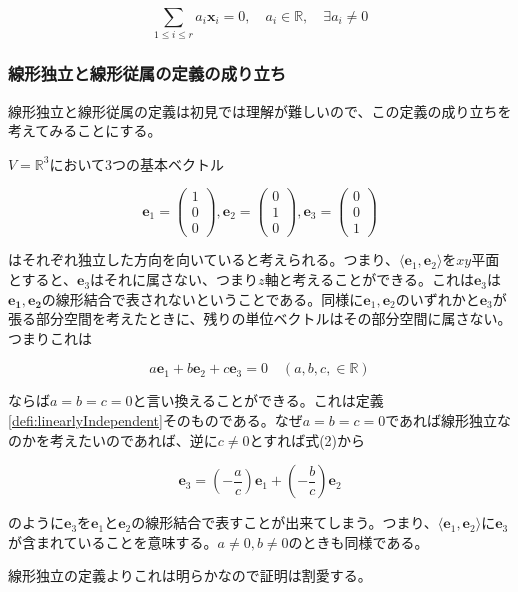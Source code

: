 \documentclass[dvipdfmx,autodetect-engine]{jsarticle}
\newcommand{\vecSpace}[1]{\mathbb{R}^{#1}}
\begin{document}
$$
\sum_{1 \leq i \leq r} a_i\bm{x}_i = 0, \quad a_i \in \mathbb{R}, \quad \exists a_i \neq 0
$$

\subsubsection{線形独立と線形従属の定義の成り立ち}

線形独立と線形従属の定義は初見では理解が難しいので、この定義の成り立ちを考えてみることにする。

$V = \vecSpace{3}$において3つの基本ベクトル

$$
\bm{e}_1 = \begin{pmatrix}
1 \\
0 \\
0
\end{pmatrix}, 
\bm{e}_2 = \begin{pmatrix}
0 \\
1 \\
0
\end{pmatrix}, 
\bm{e}_3 = \begin{pmatrix}
0 \\
0 \\
1
\end{pmatrix}
$$

はそれぞれ独立した方向を向いていると考えられる。つまり、$\langle \bm{e}_1, \bm{e}_2 \rangle$を$xy$平面とすると、$\bm{e}_3$はそれに属さない、つまり$z$軸と考えることができる。これは$\bm{e}_3$は$\bm{e_1}, \bm{e_2}$の線形結合で表されないということである。同様に$\bm{e}_1, \bm{e}_2$のいずれかと$\bm{e}_3$が張る部分空間を考えたときに、残りの単位ベクトルはその部分空間に属さない。つまりこれは

\begin{equation}
    a\bm{e}_1 + b\bm{e}_2 + c\bm{e}_3 = 0 \quad (a, b, c, \in \mathbb{R}) 
\end{equation}

ならば$a = b = c = 0$と言い換えることができる。これは定義\ref{defi:linearlyIndependent}そのものである。なぜ$a = b = c = 0$であれば線形独立なのかを考えたいのであれば、逆に$c \neq 0$とすれば式(2)から

$$
\bm{e}_3 = \left(-\frac{a}{c}\right)\bm{e}_1 + \left(-\frac{b}{c}\right)\bm{e}_2
$$

のように$\bm{e}_3$を$\bm{e}_1$と$\bm{e}_2$の線形結合で表すことが出来てしまう。つまり、$\langle \bm{e}_1, \bm{e}_2 \rangle$に$\bm{e}_3$が含まれていることを意味する。$a \neq 0, b \neq 0$のときも同様である。

線形独立の定義よりこれは明らかなので証明は割愛する。
\end{document}

